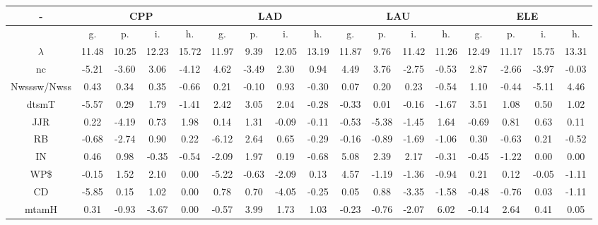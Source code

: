 \documentclass[%
 aip,
 jmp,%
 amsmath,amssymb,
 reprint,%
 floatfix,
]{revtex4-1}
\begin{document}
\begin{table}
    \centering
    \footnotesize
\setlength{\tabcolsep}{.26667em}
\begin{tabular}{|c|| c|c|c|c|| c|c|c|c|| c|c|c|c|| c|c|c|c|}\hline
-\-  & \multicolumn{4}{c|}{CPP} & \multicolumn{4}{c|}{LAD} & \multicolumn{4}{c|}{LAU} & \multicolumn{4}{c|}{ELE} \\ \hline\hline
 & g. & p. & i. & h. &     g. & p. & i. & h. &    g. & p. & i. & h. &    g. & p. & i. & h. \\\hline
$\lambda$ & 11.48 & 10.25 & 12.23 & 15.72 & 11.97 & 9.39 & 12.05 & 13.19 & 11.87 & 9.76 & 11.42 & 11.26 & 12.49 & 11.17 & 15.75 & 13.31 \\\hline
nc & -5.21 & -3.60 & 3.06 & -4.12 & 4.62 & -3.49 & 2.30 & 0.94 & 4.49 & 3.76 & -2.75 & -0.53 & 2.87 & -2.66 & -3.97 & -0.03 \\\hline
Nwsssw/Nwss & 0.43 & 0.34 & 0.35 & -0.66 & 0.21 & -0.10 & 0.93 & -0.30 & 0.07 & 0.20 & 0.23 & -0.54 & 1.10 & -0.44 & -5.11 & 4.46 \\\hline
dtsmT & -5.57 & 0.29 & 1.79 & -1.41 & 2.42 & 3.05 & 2.04 & -0.28 & -0.33 & 0.01 & -0.16 & -1.67 & 3.51 & 1.08 & 0.50 & 1.02 \\\hline
JJR & 0.22 & -4.19 & 0.73 & 1.98 & 0.14 & 1.31 & -0.09 & -0.11 & -0.53 & -5.38 & -1.45 & 1.64 & -0.69 & 0.81 & 0.63 & 0.11 \\\hline
RB & -0.68 & -2.74 & 0.90 & 0.22 & -6.12 & 2.64 & 0.65 & -0.29 & -0.16 & -0.89 & -1.69 & -1.06 & 0.30 & -0.63 & 0.21 & -0.52 \\\hline
IN & 0.46 & 0.98 & -0.35 & -0.54 & -2.09 & 1.97 & 0.19 & -0.68 & 5.08 & 2.39 & 2.17 & -0.31 & -0.45 & -1.22 & 0.00 & 0.00 \\\hline
WP\$ & -0.15 & 1.52 & 2.10 & 0.00 & -5.22 & -0.63 & -2.09 & 0.13 & 4.57 & -1.19 & -1.36 & -0.94 & 0.21 & 0.12 & -0.05 & -1.11 \\\hline
CD & -5.85 & 0.15 & 1.02 & 0.00 & 0.78 & 0.70 & -4.05 & -0.25 & 0.05 & 0.88 & -3.35 & -1.58 & -0.48 & -0.76 & 0.03 & -1.11 \\\hline
mtamH & 0.31 & -0.93 & -3.67 & 0.00 & -0.57 & 3.99 & 1.73 & 1.03 & -0.23 & -0.76 & -2.07 & 6.02 & -0.14 & 2.64 & 0.41 & 0.05 \\\hline

\end{tabular}
\end{table}
\end{document}
